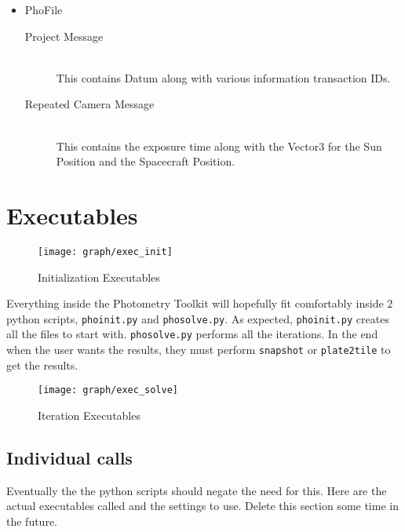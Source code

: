 \begin{itemize}
  \item PhoFile \hfill \\
    \begin{description}
      \item[Project Message] \hfill \\
        This contains Datum along with various information transaction
        IDs.
      \item[Repeated Camera Message] \hfill \\
        This contains the exposure time along with the Vector3 for the
        Sun Position and the Spacecraft Position.
    \end{description}
\end{itemize}

\section{Executables}

\begin{wrapfigure}{r}{0.5\textwidth}
  \begin{center}
    \texttt{[image: graph/exec\_init]}
  \end{center}
  \caption{Initialization Executables}
\end{wrapfigure}

Everything inside the Photometry Toolkit will hopefully fit
comfortably inside 2 python scripts, \texttt{phoinit.py} and
\texttt{phosolve.py}. As expected, \texttt{phoinit.py} creates all the
files to start with. \texttt{phosolve.py} performs all the
iterations. In the end when the user wants the results, they must
perform \texttt{snapshot} or \texttt{plate2tile} to get the results.

\begin{wrapfigure}{r}{0.5\textwidth}
  \begin{center}
    \texttt{[image: graph/exec\_solve]}
  \end{center}
  \caption{Iteration Executables}
\end{wrapfigure}

\subsection{Individual calls}

Eventually the the python scripts should negate the need for
this. Here are the actual executables called and the settings to
use. Delete this section some time in the future.

